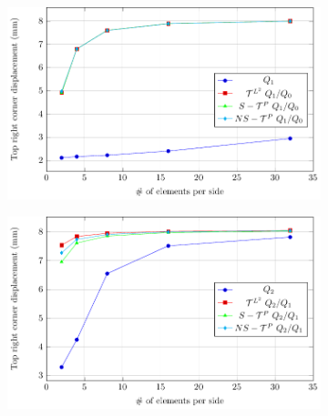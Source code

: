 \begin{figure}[H]
    \centering
    \begin{subfigure}[b]{\textwidth}
        \centering
        \includegraphics[width=.62\linewidth]{Cook's_membrane_Q1}
    \end{subfigure}
    \centering
    \begin{subfigure}[b]{\textwidth}
        \centering
        \includegraphics[width=.62\linewidth]{Cook's_membrane_Q2}
    \end{subfigure}
\end{figure}

